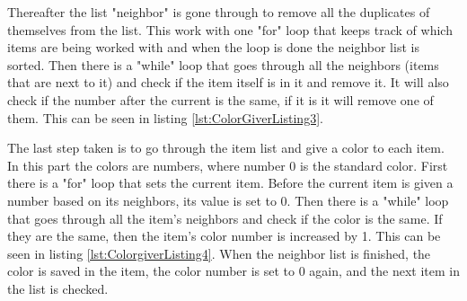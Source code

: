 Thereafter the list "neighbor" is gone through to remove all the duplicates of themselves from the list. This work with one "for" loop that keeps track of which items are being worked with and when the loop is done the neighbor list is sorted. Then there is a "while" loop that goes through all the neighbors (items that are next to it) and check if the item itself is in it and remove it. It will also check if the number after the current is the same, if it is it will remove one of them. This can be seen in listing \ref{lst:ColorGiverListing3}.

The last step taken is to go through the item list and give a color to each item. In this part the colors are numbers, where number 0 is the standard color. First there is a "for" loop that sets the current item. Before the current item is given a number based on its neighbors, its value is set to 0. Then there is a "while" loop that goes through all the item's neighbors and check if the color is the same. If they are the same, then the item's color number is increased by 1. This can be seen in listing \ref{lst:ColorgiverListing4}. When the neighbor list is finished, the color is saved in the item, the color number is set to 0 again, and the next item in the list is checked.
